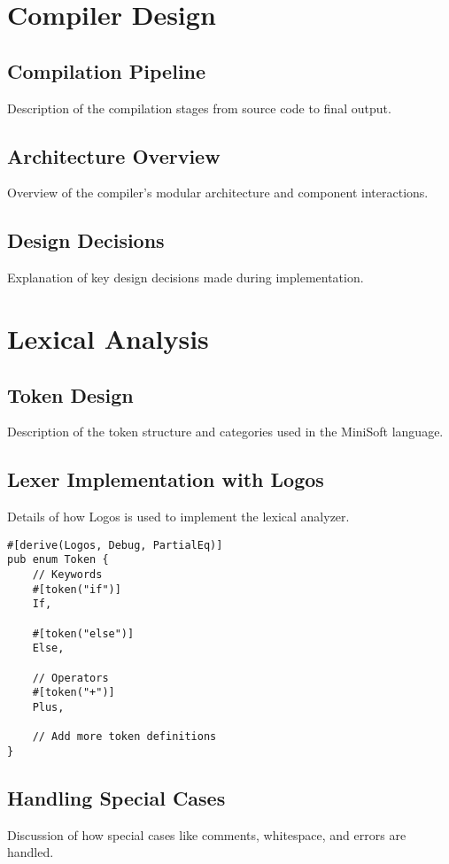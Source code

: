 \documentclass[12pt,a4paper]{article}
\begin{document}
\section{Compiler Design}
\subsection{Compilation Pipeline}
Description of the compilation stages from source code to final output.

\subsection{Architecture Overview}
Overview of the compiler's modular architecture and component interactions.

\subsection{Design Decisions}
Explanation of key design decisions made during implementation.

\section{Lexical Analysis}
\subsection{Token Design}
Description of the token structure and categories used in the MiniSoft language.

\subsection{Lexer Implementation with Logos}
Details of how Logos is used to implement the lexical analyzer.

\begin{lstlisting}[caption={Token Definitions in Logos}]
#[derive(Logos, Debug, PartialEq)]
pub enum Token {
    // Keywords
    #[token("if")]
    If,
    
    #[token("else")]
    Else,
    
    // Operators
    #[token("+")]
    Plus,
    
    // Add more token definitions
}
\end{lstlisting}

\subsection{Handling Special Cases}
Discussion of how special cases like comments, whitespace, and errors are handled.
\end{document}
